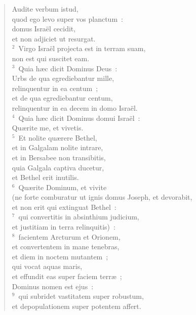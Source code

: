 \begin{flushleft}\begin{verse}\vspace{-19pt}Audite verbum istud,\\ quod ego levo super vos planctum~:\\ domus Isra\"el cecidit,\\ et non adjiciet ut resurgat.\\
${}^{2}$~Virgo Isra\"el projecta est in terram suam,\\ non est qui suscitet eam.\\
${}^{3}$~Quia h\ae c dicit Dominus Deus~:\\ Urbs de qua egrediebantur mille,\\ relinquentur in ea centum~;\\ et de qua egrediebantur centum,\\ relinquentur in ea decem in domo Isra\"el.\\
${}^{4}$~Quia h\ae c dicit Dominus domui Isra\"el~:\\ Qu\ae rite me, et vivetis.\\
${}^{5}$~Et nolite qu\ae rere Bethel,\\ et in Galgalam nolite intrare,\\ et in Bersabee non transibitis,\\ quia Galgala captiva ducetur,\\ et Bethel erit inutilis.\\
${}^{6}$~Qu\ae rite Dominum, et vivite\\ (ne forte comburatur ut ignis domus Joseph, et devorabit,\\ et non erit qui extinguat Bethel~:\\
${}^{7}$~qui convertitis in absinthium judicium,\\ et justitiam in terra relinquitis)~:\\
${}^{8}$~facientem Arcturum et Orionem,\\ et convertentem in mane tenebras,\\ et diem in noctem mutantem~;\\ qui vocat aquas maris,\\ et effundit eas super faciem terr\ae~;\\ Dominus nomen est ejus~:\\
${}^{9}$~qui subridet vastitatem super robustum,\\ et depopulationem super potentem affert.\\

\end{verse}
\end{flushleft}

